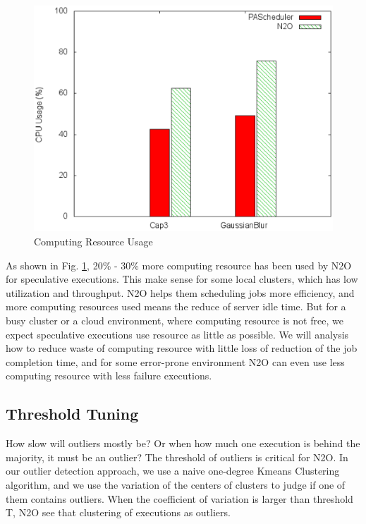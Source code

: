\begin{figure}
\centering
\includegraphics[width=0.9\columnwidth]{figures/resource_usage.eps}
\caption{Computing Resource Usage}
\label{figure:resourceusage}
\end{figure}

As shown in Fig.  \ref{figure:resourceusage}, 20\% - 30\% more computing resource has been used by N2O for speculative executions. This make sense for some local clusters, which has low utilization and throughput. N2O helps them scheduling jobs more efficiency, and more computing resources used means the reduce of server idle time. But for a busy cluster or a cloud environment, where computing resource is not free, we expect speculative executions use resource as little as possible. We will analysis how to reduce waste of computing resource with little loss of reduction of the job completion time, and for some error-prone environment N2O can even use less computing resource with less failure executions.

\subsection{Threshold Tuning}

How slow will outliers mostly be? Or when how much one execution is behind the majority, it must be an outlier? The threshold of outliers is critical for N2O. In our outlier detection approach, we use a naive one-degree Kmeans Clustering algorithm, and we use the variation of the centers of clusters to judge if one of them contains outliers. When the coefficient of variation is larger than threshold T, N2O see that clustering of executions as outliers.

